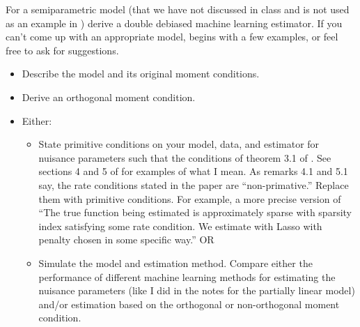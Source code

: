 \begin{problem}
  For a semiparametric model (that we have not discussed in class
  and is not used as an example in \cite{chernozhukov2018}) derive a double
  debiased machine learning estimator. If you can't come up with an
  appropriate model, \cite{chen2007} begins with a few examples, or
  feel free to ask for suggestions.
  \begin{itemize}
  \item Describe the model and its original moment conditions.
  \item Derive an orthogonal moment condition.
  \item Either:
    \begin{itemize}
    \item State primitive conditions on your model, data, and estimator
      for nuisance parameters such that the conditions of theorem 3.1 of
      \cite{chernozhukov2018}. See sections 4 and 5 of
      \cite{chernozhukov2018} for examples of what I mean. As remarks
      4.1 and 5.1 say, the rate conditions stated in the paper are
      ``non-primative.'' Replace them with primitive conditions. For
      example, a more precise version of ``The true function being
      estimated is approximately sparse with sparsity index satisfying
      some rate condition. We estimate with Lasso with penalty chosen in
      some specific way.'' OR
    \item Simulate the model and estimation method. Compare either the
      performance of different machine learning methods for estimating
      the nuisance parameters (like I did in the notes for the
      partially linear model) and/or estimation based on the
      orthogonal or non-orthogonal moment condition.
    \end{itemize}
  \end{itemize}
\end{problem}









